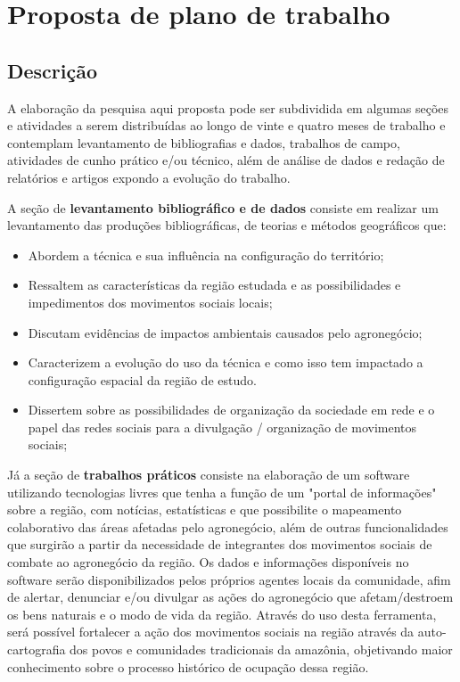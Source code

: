 \chapter{Proposta de plano de trabalho}

\section{Descrição}

A elaboração da pesquisa aqui proposta pode ser subdividida em algumas seções e atividades a serem distribuídas ao longo de vinte e quatro meses de trabalho e contemplam levantamento de bibliografias e dados, trabalhos de campo, atividades de cunho prático e/ou técnico, além de análise de dados e redação de relatórios e artigos expondo a evolução do trabalho.

A seção de \textbf{levantamento bibliográfico e de dados} consiste em realizar um levantamento das produções bibliográficas, de teorias e métodos geográficos que:

\begin{itemize}
 \item Abordem a técnica e sua influência na configuração do território;
 \item Ressaltem as características da região estudada e as possibilidades e impedimentos dos movimentos sociais locais;
 \item Discutam evidências de impactos ambientais causados pelo agronegócio;
 \item Caracterizem a evolução do uso da técnica e como isso tem impactado a configuração espacial da região de estudo.
 \item Dissertem sobre as possibilidades de organização da sociedade em rede e o papel das redes sociais para a divulgação / organização de movimentos sociais;
\end{itemize}

Já a seção de \textbf{trabalhos práticos} consiste na elaboração de um software utilizando tecnologias livres que tenha a função de um "portal de informações" sobre a região, com notícias, estatísticas e que possibilite o mapeamento colaborativo das áreas afetadas pelo agronegócio, além de outras funcionalidades que surgirão a partir da necessidade de integrantes dos movimentos sociais de combate ao agronegócio da região. Os dados e informações disponíveis no software serão disponibilizados pelos próprios agentes locais da comunidade, afim de alertar, denunciar e/ou divulgar as ações do agronegócio que afetam/destroem os bens naturais e o modo de vida da região. Através do uso desta ferramenta, será possível fortalecer a ação dos movimentos sociais na região através da auto-cartografia dos povos e comunidades tradicionais da amazônia, objetivando maior conhecimento sobre o processo histórico de ocupação dessa região.

